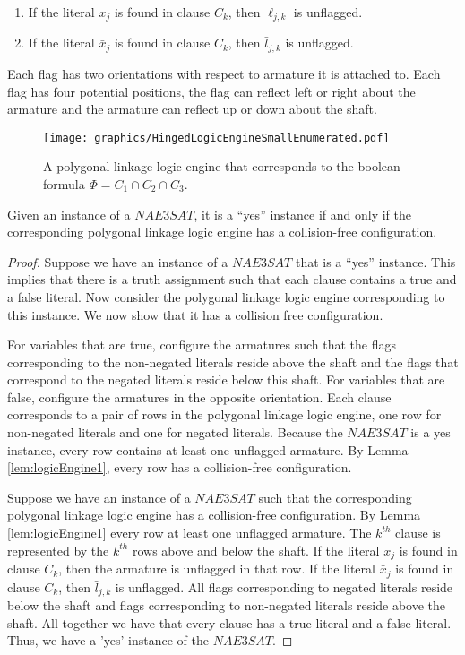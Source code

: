 \begin{enumerate}
	 \item If the literal $x_j$ is found in clause $C_k$, then $\ell_{j,k}$ is unflagged.
	 \item If the literal $\bar{x}_j$ is found in clause $C_k$, then $\bar{l}_{j,k}$ is unflagged.
\end{enumerate}

Each flag has two orientations with respect to armature it is attached to.  Each flag has four potential positions, the flag can reflect left or right about the armature and the armature can reflect up or down about the shaft.

\begin{figure}[!htbp]
\begin{center}
\texttt{[image: graphics/HingedLogicEngineSmallEnumerated.pdf]}
\caption{A polygonal linkage logic engine that corresponds to the boolean formula $\Phi = C_1 \cap C_2 \cap C_3$.}\label{fig:HingedLogicEngineSmallEnumerated.pdf}
\end{center}
\end{figure}

\begin{thm}\label{thm:chp2-HingedPolygons-1}
 Given an instance of a $NAE3SAT$,  it is a ``yes'' instance if and only if the 
corresponding polygonal linkage logic engine has a collision-free configuration.  
\end{thm}
\begin{proof}
Suppose we have an instance of a $NAE3SAT$ that is a ``yes'' instance. This implies that there is a 
truth assignment such that each clause contains a true and a false literal. Now consider the polygonal linkage logic 
engine corresponding to this instance. We now 
show that it has a collision free configuration.

For variables that are true, configure the armatures such that the flags corresponding to the 
non-negated literals reside above the 
shaft and the flags that correspond to the negated literals reside below this shaft.  For variables 
that are false, configure the 
armatures in the opposite orientation.  Each clause corresponds to a pair of rows in 
the polygonal linkage logic engine, one row for non-negated literals and one for negated literals.  Because the 
$NAE3SAT$ is a yes instance, every row contains at least one unflagged armature.  
By Lemma \ref{lem:logicEngine1}, every row  has a collision-free configuration.

Suppose we have an instance of a $NAE3SAT$ such that the corresponding polygonal linkage logic engine has a 
collision-free configuration. By Lemma \ref{lem:logicEngine1} every row at least one unflagged 
armature.  The $k^{th}$ clause is represented by the $k^{th}$ rows above and below the shaft. If the 
literal $x_j$ is found in clause $C_k$, then the armature is unflagged in that row. If the literal 
$\bar{x}_j$ is found in clause $C_k$, then $\bar{l}_{j,k}$ is unflagged.  All flags 
corresponding to negated literals reside below the shaft and flags corresponding to non-negated 
literals reside above the shaft.  All together we have that every clause has a true literal and a 
false literal.  Thus, we have a 'yes' instance of the $NAE3SAT$.
\end{proof}